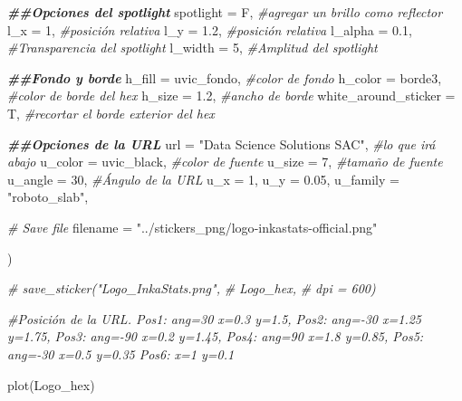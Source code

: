 \documentclass[
]{article}
\newenvironment{Shaded}{\begin{snugshade}}{\end{snugshade}}
\newcommand{\AttributeTok}[1]{\textcolor[rgb]{0.77,0.63,0.00}{#1}}
\newcommand{\CommentTok}[1]{\textcolor[rgb]{0.56,0.35,0.01}{\textit{#1}}}
\newcommand{\DecValTok}[1]{\textcolor[rgb]{0.00,0.00,0.81}{#1}}
\newcommand{\DocumentationTok}[1]{\textcolor[rgb]{0.56,0.35,0.01}{\textbf{\textit{#1}}}}
\newcommand{\FloatTok}[1]{\textcolor[rgb]{0.00,0.00,0.81}{#1}}
\newcommand{\FunctionTok}[1]{\textcolor[rgb]{0.00,0.00,0.00}{#1}}
\newcommand{\NormalTok}[1]{#1}
\newcommand{\StringTok}[1]{\textcolor[rgb]{0.31,0.60,0.02}{#1}}
\begin{document}
\begin{Shaded}
\begin{Highlighting}[]
    \DocumentationTok{\#\#Opciones del spotlight}
    \AttributeTok{spotlight            =}\NormalTok{ F, }\CommentTok{\#agregar un brillo como reflector }
    \AttributeTok{l\_x                  =} \DecValTok{1}\NormalTok{, }\CommentTok{\#posición relativa}
    \AttributeTok{l\_y                  =} \FloatTok{1.2}\NormalTok{, }\CommentTok{\#posición relativa}
    \AttributeTok{l\_alpha              =} \FloatTok{0.1}\NormalTok{, }\CommentTok{\#Transparencia del spotlight}
    \AttributeTok{l\_width              =} \DecValTok{5}\NormalTok{, }\CommentTok{\#Amplitud del spotlight}
    
    \DocumentationTok{\#\#Fondo y borde}
    \AttributeTok{h\_fill               =}\NormalTok{ uvic\_fondo, }\CommentTok{\#color de fondo}
    \AttributeTok{h\_color              =}\NormalTok{ borde3, }\CommentTok{\#color de borde del hex}
    \AttributeTok{h\_size               =} \FloatTok{1.2}\NormalTok{, }\CommentTok{\#ancho de borde}
    \AttributeTok{white\_around\_sticker =}\NormalTok{ T, }\CommentTok{\#recortar el borde exterior del hex}
    
    \DocumentationTok{\#\#Opciones de la URL}
    \AttributeTok{url                  =} \StringTok{"Data Science Solutions SAC"}\NormalTok{, }\CommentTok{\#lo que irá abajo          }
    \AttributeTok{u\_color              =}\NormalTok{ uvic\_black, }\CommentTok{\#color de fuente}
    \AttributeTok{u\_size               =} \DecValTok{7}\NormalTok{, }\CommentTok{\#tamaño de fuente}
    \AttributeTok{u\_angle              =} \DecValTok{30}\NormalTok{, }\CommentTok{\#Ángulo de la URL}
    \AttributeTok{u\_x                  =} \DecValTok{1}\NormalTok{, }
    \AttributeTok{u\_y                  =} \FloatTok{0.05}\NormalTok{, }
    \AttributeTok{u\_family             =} \StringTok{"roboto\_slab"}\NormalTok{, }
    
    \CommentTok{\# Save file}
    \AttributeTok{filename             =} \StringTok{"../stickers\_png/logo{-}inkastats{-}official.png"}
    
\NormalTok{  )  }

\CommentTok{\# save\_sticker("Logo\_InkaStats.png", }
\CommentTok{\#              Logo\_hex, }
\CommentTok{\#              dpi         = 600)}

\CommentTok{\#Posición de la URL. Pos1: ang=30 x=0.3 y=1.5, Pos2: ang={-}30 x=1.25 y=1.75, Pos3: ang={-}90 x=0.2 y=1.45, Pos4: ang=90 x=1.8 y=0.85, Pos5: ang={-}30 x=0.5 y=0.35 Pos6: x=1 y=0.1}

\FunctionTok{plot}\NormalTok{(Logo\_hex)}
\end{Highlighting}
\end{Shaded}
\end{document}

